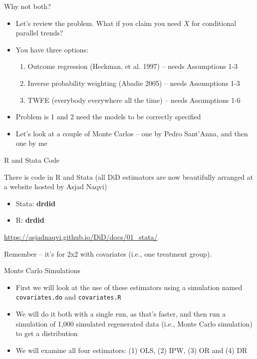 \documentclass{beamer}
\begin{document}
\begin{frame}{Why not both?}

\begin{itemize}
\item Let's review the problem.  What if you claim you need $X$ for conditional parallel trends?
\item You have three options:
	\begin{enumerate}
	\item Outcome regression (Heckman, et al. 1997) -- needs Assumptions 1-3
	\item Inverse probability weighting (Abadie 2005) -- needs Assumptions 1-3
	\item TWFE (everybody everywhere all the time) -- needs Assumptions 1-6
	\end{enumerate}
\item Problem is 1 and 2 need the models to be correctly specified
\item Let's look at a couple of Monte Carlos -- one by Pedro Sant'Anna, and then one by me
\end{itemize}

\end{frame}






\begin{frame}{R and Stata Code}

There is code in R and Stata (all DiD estimators are now beautifully arranged at a website hosted by Asjad Naqvi)
\begin{itemize}
\item Stata: \textbf{drdid}
\item R: \textbf{drdid}
\end{itemize}

\bigskip

\url{https://asjadnaqvi.github.io/DiD/docs/01_stata/}

\bigskip

Remember -- it's for 2x2 with covariates (i.e., one treatment group). 

\end{frame}


\begin{frame}{Monte Carlo Simulations}

\begin{itemize}

\item First we will look at the use of these estimators using a simulation named \texttt{covariates.do} and \texttt{covariates.R}

\item We will do it both with a single run, as that's faster, and then run a simulation of 1,000 simulated regenerated data (i.e., Monte Carlo simulation) to get a distribution

\item We will examine all four estimators: (1) OLS, (2) IPW, (3) OR and (4) DR

\end{itemize}

\end{frame}
\end{document}
